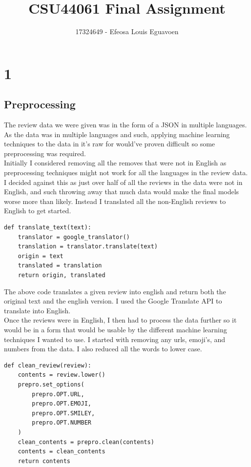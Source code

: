 \documentclass[11pt]{article} %
\title{CSU44061 Final Assignment}
\author{17324649 - Efeosa Louis Eguavoen}
\begin{document}
\maketitle

\section{1}
\subsection{Preprocessing}
The review data we were given was in the form of a JSON in multiple languages.  As the data was in multiple languages and such,  applying machine learning techniques to the data in it's raw for would've proven difficult so some preprocessing was required.  
\\ Initially I considered removing all the removes that were not in English as preprocessing techniques might not work for all the languages in the review data.  I decided against this as just over half of all the reviews in the data were not in English,  and such throwing away that much data would make the final models worse more than likely.  Instead I translated all the non-English reviews to English to get started. 
\begin{verbatim}
def translate_text(text):
    translator = google_translator()
    translation = translator.translate(text)
    origin = text
    translated = translation
    return origin, translated
\end{verbatim}
The above code translates a given review into english and return both the original text and the english version.  I used the Google Translate API to translate into English.
\\ Once the reviews were in English,  I then had to process the data further so it would be in a form that would be usable by the different machine learning techniques I wanted to use.  I started with removing any urls,  emoji's, and numbers from the data.  I also reduced all the words to lower case. 
\begin{verbatim}
def clean_review(review):
    contents = review.lower()
    prepro.set_options(
        prepro.OPT.URL,
        prepro.OPT.EMOJI,
        prepro.OPT.SMILEY,
        prepro.OPT.NUMBER
    )
    clean_contents = prepro.clean(contents)
    contents = clean_contents
    return contents
\end{verbatim}
\end{document}
